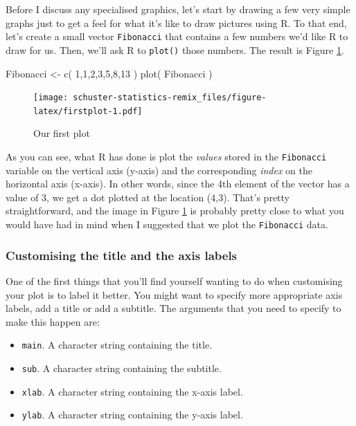 \documentclass[
]{book}
\newenvironment{Shaded}{\begin{snugshade}}{\end{snugshade}}
\newcommand{\DecValTok}[1]{\textcolor[rgb]{0.00,0.00,0.81}{#1}}
\newcommand{\FunctionTok}[1]{\textcolor[rgb]{0.00,0.00,0.00}{#1}}
\newcommand{\NormalTok}[1]{#1}
\newcommand{\OtherTok}[1]{\textcolor[rgb]{0.56,0.35,0.01}{#1}}
\providecommand{\tightlist}{%
  \setlength{\itemsep}{0pt}\setlength{\parskip}{0pt}}
\begin{document}
Before I discuss any specialised graphics, let's start by drawing a few very simple graphs just to get a feel for what it's like to draw pictures using R. To that end, let's create a small vector \texttt{Fibonacci} that contains a few numbers we'd like R to draw for us. Then, we'll ask R to \texttt{plot()} those numbers. The result is Figure \ref{fig:firstplot}.

\begin{Shaded}
\begin{Highlighting}[]
\NormalTok{Fibonacci }\OtherTok{\textless{}{-}} \FunctionTok{c}\NormalTok{( }\DecValTok{1}\NormalTok{,}\DecValTok{1}\NormalTok{,}\DecValTok{2}\NormalTok{,}\DecValTok{3}\NormalTok{,}\DecValTok{5}\NormalTok{,}\DecValTok{8}\NormalTok{,}\DecValTok{13}\NormalTok{ )}
\FunctionTok{plot}\NormalTok{( Fibonacci )}
\end{Highlighting}
\end{Shaded}

\begin{figure}
\centering
\texttt{[image: schuster-statistics-remix\_files/figure-latex/firstplot-1.pdf]}
\caption{\label{fig:firstplot}Our first plot}
\end{figure}

As you can see, what R has done is plot the \emph{values} stored in the \texttt{Fibonacci} variable on the vertical axis (y-axis) and the corresponding \emph{index} on the horizontal axis (x-axis). In other words, since the 4th element of the vector has a value of 3, we get a dot plotted at the location (4,3). That's pretty straightforward, and the image in Figure \ref{fig:firstplot} is probably pretty close to what you would have had in mind when I suggested that we plot the \texttt{Fibonacci} data.

\hypertarget{figtitles}{%
\subsubsection{Customising the title and the axis labels}\label{figtitles}}

One of the first things that you'll find yourself wanting to do when customising your plot is to label it better. You might want to specify more appropriate axis labels, add a title or add a subtitle. The arguments that you need to specify to make this happen are:

\begin{itemize}
\tightlist
\item
  \texttt{main}. A character string containing the title.
\item
  \texttt{sub}. A character string containing the subtitle.
\item
  \texttt{xlab}. A character string containing the x-axis label.
\item
  \texttt{ylab}. A character string containing the y-axis label.
\end{itemize}
\end{document}
